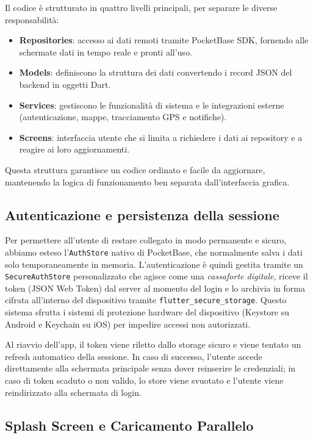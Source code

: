 \documentclass[12pt,a4paper]{article}
\begin{document}
Il codice è strutturato in quattro livelli principali, per separare le diverse responsabilità:

\begin{itemize}
  \item \textbf{Repositories}: accesso ai dati remoti tramite PocketBase SDK,
    fornendo alle schermate dati in tempo reale e pronti all'uso.
  \item \textbf{Models}: definiscono la struttura dei dati 
    convertendo i record JSON del backend in oggetti Dart.
  \item \textbf{Services}: gestiscono le funzionalità di sistema e le integrazioni esterne 
    (autenticazione, mappe, tracciamento GPS e notifiche).
  \item \textbf{Screens}: interfaccia utente che si limita a richiedere i dati ai
    repository e a reagire ai loro aggiornamenti.
\end{itemize}

Questa struttura garantisce un codice ordinato e facile da aggiornare, 
mantenendo la logica di funzionamento ben separata dall'interfaccia grafica.

\subsection{Autenticazione e persistenza della sessione}

Per permettere all'utente di restare collegato in modo permanente e sicuro,
abbiamo esteso l'\texttt{AuthStore} nativo di PocketBase, 
che normalmente salva i dati solo temporaneamente in memoria. 
L'autenticazione è quindi gestita tramite un \texttt{SecureAuthStore} personalizzato 
che agisce come una \textit{cassaforte digitale}, riceve il token (JSON Web Token) 
dal server al momento del login e lo archivia in forma cifrata 
all'interno del dispositivo tramite \texttt{flutter\_secure\_storage}. 
Questo sistema sfrutta i sistemi di protezione hardware del dispositivo 
(Keystore su Android e Keychain su iOS) per impedire accessi non autorizzati.

Al riavvio dell'app, il token viene riletto dallo storage sicuro e viene
tentato un refresh automatico della sessione. In caso di successo, l'utente accede
direttamente alla schermata principale senza dover reinserire le credenziali; in caso di
token scaduto o non valido, lo store viene svuotato e l'utente viene reindirizzato alla schermata di login.

\subsection{Splash Screen e Caricamento Parallelo}
\end{document}
